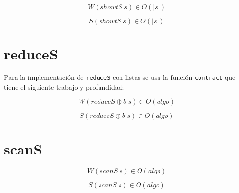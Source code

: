\documentclass[a4paper,10pt]{article}
\begin{document}
\begin{equation*}
    W \left( showtS \; s \right) \in
    O \left( \vert s \vert \right)
\end{equation*}

\begin{equation*}
    S \left( showtS \; s \right) \in
    O \left( \vert s \vert \right)
\end{equation*}


\section*{reduceS}

Para la implementación de \texttt{reduceS} con listas se usa la función
\texttt{contract} que tiene el siguiente trabajo y profundidad:


%

\begin{equation*}
    W \left( reduceS \oplus b \; s \right) \in
    O \left( algo \right)
\end{equation*}

\begin{equation*}
    S \left( reduceS \oplus b \; s \right) \in
    O \left( algo \right)
\end{equation*}

\section*{scanS}

\begin{equation*}
    W \left( scanS \; s \right) \in O \left( algo \right)
\end{equation*}

\begin{equation*}
    S \left( scanS \; s \right) \in O \left( algo \right)
\end{equation*}

\newpage{}

\setcounter{section}{0}
\end{document}
